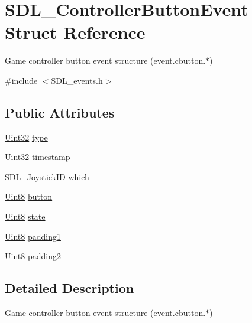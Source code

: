 \hypertarget{struct_s_d_l___controller_button_event}{\section{S\-D\-L\-\_\-\-Controller\-Button\-Event Struct Reference}
\label{struct_s_d_l___controller_button_event}
}


Game controller button event structure (event.\-cbutton.$\ast$)  




{\ttfamily \#include $<$S\-D\-L\-\_\-events.\-h$>$}

\subsection*{Public Attributes}
\begin{DoxyCompactItemize}
\item 
\hyperlink{_s_d_l__stdinc_8h_add440eff171ea5f55cb00c4a9ab8672d}{Uint32} \hyperlink{struct_s_d_l___controller_button_event_a09869d792031e47a88673d85915c209f}{type}
\item 
\hyperlink{_s_d_l__stdinc_8h_add440eff171ea5f55cb00c4a9ab8672d}{Uint32} \hyperlink{struct_s_d_l___controller_button_event_a73003712734c4d2f966db3d7c2ce826b}{timestamp}
\item 
\hyperlink{_s_d_l__joystick_8h_a3c3d32500cb08f76ee8077983912c0bd}{S\-D\-L\-\_\-\-Joystick\-I\-D} \hyperlink{struct_s_d_l___controller_button_event_a98777e88b5d5cae83eef16ffd4bcacc1}{which}
\item 
\hyperlink{_s_d_l__stdinc_8h_a2944638813a090aa23e62f4da842c3e2}{Uint8} \hyperlink{struct_s_d_l___controller_button_event_a039da6cd31c3c62e62a3ae17cc64d0db}{button}
\item 
\hyperlink{_s_d_l__stdinc_8h_a2944638813a090aa23e62f4da842c3e2}{Uint8} \hyperlink{struct_s_d_l___controller_button_event_a00c46683f86674c2a4f74404ee3e857c}{state}
\item 
\hyperlink{_s_d_l__stdinc_8h_a2944638813a090aa23e62f4da842c3e2}{Uint8} \hyperlink{struct_s_d_l___controller_button_event_a34d3e43fc1994288b9b083c874bc0899}{padding1}
\item 
\hyperlink{_s_d_l__stdinc_8h_a2944638813a090aa23e62f4da842c3e2}{Uint8} \hyperlink{struct_s_d_l___controller_button_event_a8caf56a3921227913cfb652d5de1eec4}{padding2}
\end{DoxyCompactItemize}


\subsection{Detailed Description}
Game controller button event structure (event.\-cbutton.$\ast$) 

